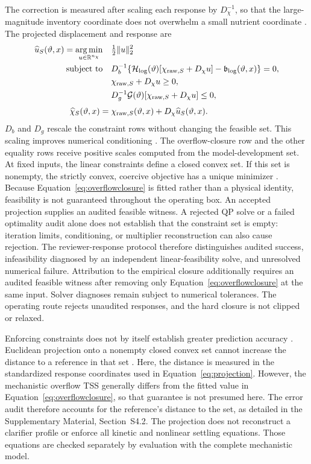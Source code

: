 \documentclass[a4paper,fleqn]{cas-sc}
\DeclareMathOperator*{\argminop}{arg\,min}
\newcommand{\R}{\mathbb{R}}
\begin{document}
The correction is measured after scaling each response by $D_\chi^{-1}$, so that the large-magnitude inventory coordinate does not overwhelm a small nutrient coordinate \citep{SturmSilva2025}. The projected displacement and response are \citep{Selerio2026,Valente2025}
\begin{align}
\widehat u_S(\vartheta,x)=\argminop_{u\in\R^{n_\chi}}\quad&\tfrac12\|u\|_2^2
\label{eq:projection}\\
\text{subject to}\quad&
 D_b^{-1}\{\mathcal H_{\log}(\vartheta)[\chi_{{\rm raw},S}+D_\chi u]-\mathfrak b_{\log}(\vartheta,x)\}=0,\notag\\
&\chi_{{\rm raw},S}+D_\chi u\ge0,\notag\\
&D_g^{-1}\mathcal G(\vartheta)[\chi_{{\rm raw},S}+D_\chi u]\le0,\notag\\[1mm]
\widehat\chi_S(\vartheta,x)={}&\chi_{{\rm raw},S}(\vartheta,x)+D_\chi\widehat u_S(\vartheta,x).
\label{eq:projected}
\end{align}
$D_b$ and $D_g$ rescale the constraint rows without changing the feasible set. This scaling improves numerical conditioning \citep[Section~11.8.2]{Boyd2004}. The overflow-closure row and the other equality rows receive positive scales computed from the model-development set. At fixed inputs, the linear constraints define a closed convex set. If this set is nonempty, the strictly convex, coercive objective has a unique minimizer \citep{Boyd2004}. Because Equation~\eqref{eq:overflowclosure} is fitted rather than a physical identity, feasibility is not guaranteed throughout the operating box. An accepted projection supplies an audited feasible witness. A rejected QP solve or a failed optimality audit alone does not establish that the constraint set is empty: iteration limits, conditioning, or multiplier reconstruction can also cause rejection. The reviewer-response protocol therefore distinguishes audited success, infeasibility diagnosed by an independent linear-feasibility solve, and unresolved numerical failure. Attribution to the empirical closure additionally requires an audited feasible witness after removing only Equation~\eqref{eq:overflowclosure} at the same input. Solver diagnoses remain subject to numerical tolerances. The operating route rejects unaudited responses, and the hard closure is not clipped or relaxed.

Enforcing constraints does not by itself establish greater prediction accuracy \citep{SturmSilva2025}. Euclidean projection onto a nonempty closed convex set cannot increase the distance to a reference in that set \citep{Boyd2004}. Here, the distance is measured in the standardized response coordinates used in Equation~\eqref{eq:projection}. However, the mechanistic overflow TSS generally differs from the fitted value in Equation~\eqref{eq:overflowclosure}, so that guarantee is not presumed here. The error audit therefore accounts for the reference's distance to the set, as detailed in the Supplementary Material, Section~S4.2. The projection does not reconstruct a clarifier profile or enforce all kinetic and nonlinear settling equations. Those equations are checked separately by evaluation with the complete mechanistic model.
\end{document}
